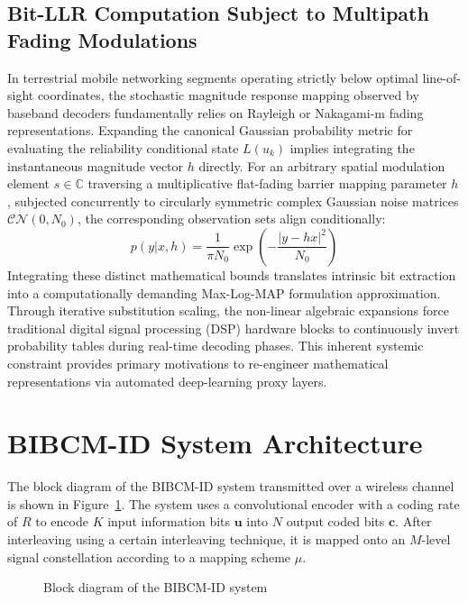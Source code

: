 \documentclass[a4paper,14pt]{extreport}
\begin{document}
\subsection{Bit-LLR Computation Subject to Multipath Fading Modulations}
In terrestrial mobile networking segments operating strictly below optimal line-of-sight coordinates, the stochastic magnitude response mapping observed by baseband decoders fundamentally relies on Rayleigh or Nakagami-m fading representations. Expanding the canonical Gaussian probability metric for evaluating the reliability conditional state $L(u_k)$ implies integrating the instantaneous magnitude vector $h$ directly. For an arbitrary spatial modulation element $s \in \mathbb{C}$ traversing a multiplicative flat-fading barrier mapping parameter $h$, subjected concurrently to circularly symmetric complex Gaussian noise matrices $\mathcal{C}\mathcal{N}(0, N_0)$, the corresponding observation sets align conditionally:
\begin{equation}
    p(y | x, h) = \frac{1}{\pi N_0} \exp\left( -\frac{|y - h x|^2}{N_0} \right)
\end{equation}
Integrating these distinct mathematical bounds translates intrinsic bit extraction into a computationally demanding Max-Log-MAP formulation approximation. Through iterative substitution scaling, the non-linear algebraic expansions force traditional digital signal processing (DSP) hardware blocks to continuously invert probability tables during real-time decoding phases. This inherent systemic constraint provides primary motivations to re-engineer mathematical representations via automated deep-learning proxy layers.

\section{BIBCM-ID System Architecture}

The block diagram of the BIBCM-ID system transmitted over a wireless channel is shown in Figure~\ref{fig:biccm_block}. The system uses a convolutional encoder with a coding rate of $R$ to encode $K$ input information bits $\mathbf{u}$ into $N$ output coded bits $\mathbf{c}$. After interleaving using a certain interleaving technique, it is mapped onto an $M$-level signal constellation according to a mapping scheme $\mu$.

\begin{figure}[H]
    \centering
    \caption{Block diagram of the BIBCM-ID system}
    \label{fig:biccm_block}
\end{figure}
\end{document}
